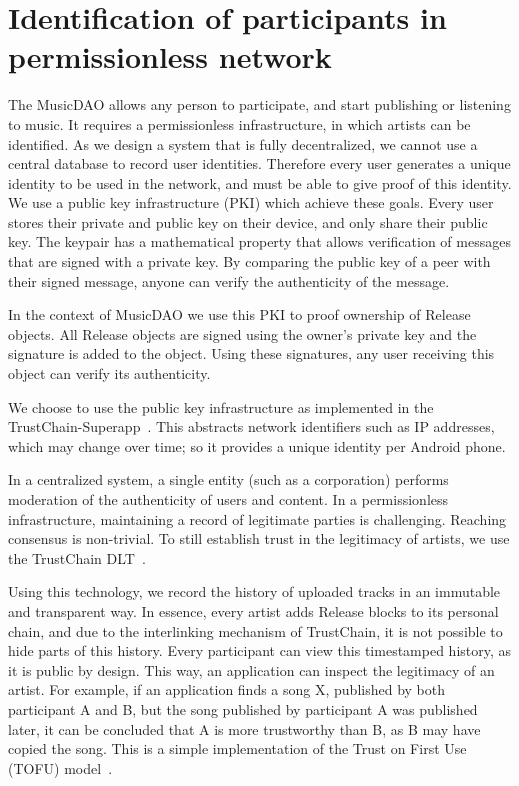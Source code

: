 \section{Identification of participants in permissionless network}
\label{sec:pki-design}
The MusicDAO allows any person to participate, and start publishing or listening to music. It requires a permissionless infrastructure, in which artists can be identified. As we design a system that is fully decentralized, we cannot use a central database to record user identities. Therefore every user generates a unique identity to be used in the network, and must be able to give proof of this identity. We use a public key infrastructure (PKI) which achieve these goals. Every user stores their private and public key on their device, and only share their public key. The keypair has a mathematical property that allows verification of messages that are signed with a private key. By comparing the public key of a peer with their signed message, anyone can verify the authenticity of the message.

In the context of MusicDAO we use this PKI to proof ownership of Release objects. All Release objects are signed using the owner's private key and the signature is added to the object. Using these signatures, any user receiving this object can verify its authenticity.

We choose to use the public key infrastructure as implemented in the TrustChain-Superapp~\citep{mattskala2020}. This abstracts network identifiers such as IP addresses, which may change over time; so it provides a unique identity per Android phone.

In a centralized system, a single entity (such as a corporation) performs moderation of the authenticity of users and content. In a permissionless infrastructure, maintaining a record of legitimate parties is challenging. Reaching consensus is non-trivial. To still establish trust in the legitimacy of artists, we use the TrustChain DLT~\citep{otte2017trustchain}.

Using this technology, we record the history of uploaded tracks in an immutable and transparent way. In essence, every artist adds Release blocks to its personal chain, and due to the interlinking mechanism of TrustChain, it is not possible to hide parts of this history. Every participant can view this timestamped history, as it is public by design. This way, an application can inspect the legitimacy of an artist. For example, if an application finds a song X, published by both participant A and B, but the song published by participant A was published later, it can be concluded that A is more trustworthy than B, as B may have copied the song. This is a simple implementation of the Trust on First Use (TOFU) model~\citep{toth2013public}.

